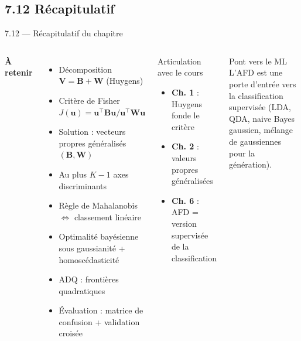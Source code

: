 \subsection{7.12 Récapitulatif}
\begin{frame}{7.12 — Récapitulatif du chapitre}
\begin{columns}[T]
\textbf{À retenir}
\begin{itemize}\small
  \item Décomposition $\mathbf{V} = \mathbf{B} + \mathbf{W}$ (Huygens)
  \item Critère de Fisher $J(\mathbf{u}) = \mathbf{u}^\top \mathbf{B} \mathbf{u} / \mathbf{u}^\top \mathbf{W} \mathbf{u}$
  \item Solution : vecteurs propres généralisés $(\mathbf{B}, \mathbf{W})$
  \item Au plus $K-1$ axes discriminants
  \item Règle de Mahalanobis $\Leftrightarrow$ classement linéaire
  \item Optimalité bayésienne sous gaussianité + homoscédasticité
  \item ADQ : frontières quadratiques
  \item Évaluation : matrice de confusion + validation croisée
\end{itemize}

\begin{block}{Articulation avec le cours}
\begin{itemize}\small
  \item \textbf{Ch. 1} : Huygens fonde le critère
  \item \textbf{Ch. 2} : valeurs propres généralisées
  \item \textbf{Ch. 6} : AFD = version supervisée de la classification
\end{itemize}
\end{block}

\begin{alertblock}{Pont vers le ML}
\small L'AFD est une porte d'entrée vers la classification supervisée
(LDA, QDA, naive Bayes gaussien, mélange de gaussiennes pour la génération).
\end{alertblock}
\end{columns}
\end{frame}
